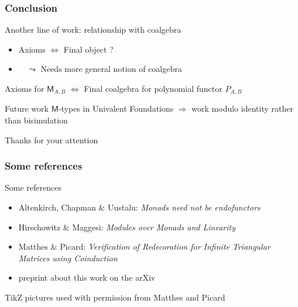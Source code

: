 \documentclass[
]
{beamer}
\newcommand{\constfont}[1]{\ensuremath{\mathsf{#1}}}
\newcommand{\M}{\constfont{M}}
\begin{document}
\begin{frame}
	\frametitle{Conclusion}
	\begin{block}{Another line of work: relationship with coalgebra}
		\begin{itemize}
			\item Axioms $\Longleftrightarrow$ Final object ?
			\item[] $\quad\leadsto$ Needs more general notion of coalgebra
		\end{itemize}
	\end{block}
	\begin{theorem}
		Axioms for $\M_{A,B}$ $\Longleftrightarrow$ Final coalgebra for polynomial functor $P_{A,B}$ 
	\end{theorem}
	\begin{block}{Future work}
		\M-types in Univalent Foundations $\Longrightarrow$ work modulo identity rather than bisimulation
	\end{block}

   \pause \begin{center} Thanks for your attention \end{center}
\end{frame}

\begin{frame}
 \frametitle{Some references}
 
  
  
  \begin{block}{Some references}
   \begin{itemize}
    \item Altenkirch, Chapman \& Uustalu: \emph{Monads need not be endofunctors}
    \item Hirschowitz \& Maggesi: \emph{Modules over Monads and Linearity}
    \item Matthes \& Picard: \emph{Verification of Redecoration for Infinite Triangular Matrices using Coinduction}
    \item preprint about this work on the arXiv
   \end{itemize}
  \end{block}

  TikZ pictures used with permission from Matthes and Picard
 
\end{frame}
\end{document}
